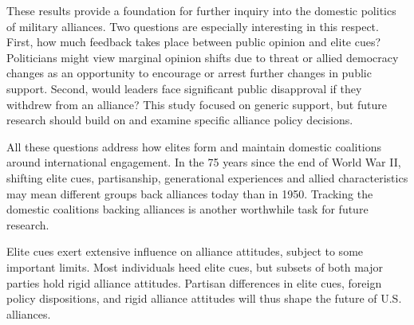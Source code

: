 \documentclass[12pt]{article}
\begin{document}
These results provide a foundation for further inquiry into the domestic politics of military alliances. 
Two questions are especially interesting in this respect.
First, how much feedback takes place between public opinion and elite cues? 
Politicians might view marginal opinion shifts due to threat or allied democracy changes as an opportunity to encourage or arrest further changes in public support.
Second, would leaders face significant public disapproval if they withdrew from an alliance? 
This study focused on generic support, but future research should build on \citet{TomzWeeks2021} and examine specific alliance policy decisions. 


All these questions address how elites form and maintain domestic coalitions around international engagement. 
In the 75 years since the end of World War II, shifting elite cues, partisanship, generational experiences and allied characteristics may mean different groups back alliances today than in 1950. 
Tracking the domestic coalitions backing alliances is another worthwhile task for future research.


Elite cues exert extensive influence on alliance attitudes, subject to some important limits.
Most individuals heed elite cues, but subsets of both major parties hold rigid alliance attitudes. 
Partisan differences in elite cues, foreign policy dispositions, and rigid alliance attitudes will thus shape the future of U.S. alliances.



\newpage

 
 
\end{document}
